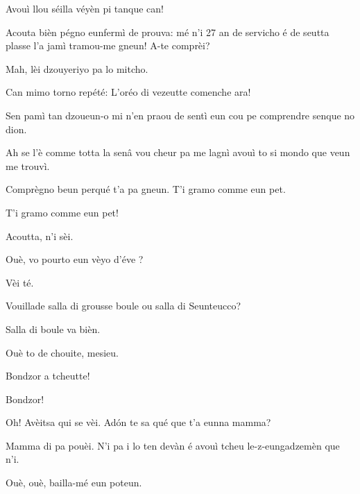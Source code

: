 \begin{drama}
\Eunfeurmispeaks {} Avouì llou séilla véyèn pi tan\-que can!

\Eunfeurmiespeaks Acouta bièn pégno eunfermì de prouva: mé n'i 27 an de servicho é de seutta plasse l’a jamì tramou-me gneun! A-te comprèi?

\Eunfeurmispeaks Mah, lèi dzouyeriyo pa lo mitcho.

\Eunfeurmiespeaks Can mimo torno repété:  L’oréo di vezeutte comenche ara!


\Gerominespeaks Sen pamì tan dzoueun-o mi n’en praou de sentì eun cou pe comprendre senque no dion.

\Casimirspeaks Ah se l’è comme totta la senâ vou cheur pa me lagnì avouì to si mondo que veun me trouvì.

\Gerominespeaks Comprègno beun perqué t’a pa gneun. T’i gramo com\-me eun pet.

\Casimirspeaks {} T'i gramo comme eun pet!

\PersEmpourtantaspeaks {} Acoutta, n’i sèi.

\Eunfeurmispeaks Ouè,  vo pourto eun vèyo d'éve \bicchiere ?

\PersEmpourtantaspeaks Vèi té.

\Eunfeurmispeaks Vouillade salla di grousse boule ou salla di Seunteucco?

\PersEmpourtantaspeaks Salla di boule va bièn.

\Eunfeurmispeaks Ouè to de chouite, mesieu.


\Feliespeaks Bondzor a tcheutte!

\Casimirspeaks {} Bondzor!

\Gerominespeaks Oh! Avèitsa qui se vèi. Ad\'on te sa qué que t’a eunna mamma?

\Feliespeaks Mamma di pa pouèi. N’i pa i lo ten devàn é avouì tcheu le-z-eungadzemèn que n'i.

\Gerominespeaks Ouè, ouè, bailla-mé eun poteun.



\end{drama}
